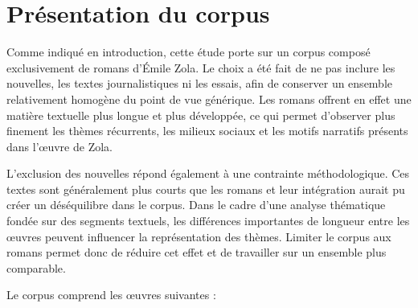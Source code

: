 \section{Présentation du corpus}

Comme indiqué en introduction, cette étude porte sur un corpus composé exclusivement de romans d'Émile Zola. Le choix a été fait de ne pas inclure les nouvelles, les textes journalistiques ni les essais, afin de conserver un ensemble relativement homogène du point de vue générique. Les romans offrent en effet une matière textuelle plus longue et plus développée, ce qui permet d'observer plus finement les thèmes récurrents, les milieux sociaux et les motifs narratifs présents dans l'œuvre de Zola.

L'exclusion des nouvelles répond également à une contrainte méthodologique. Ces textes sont généralement plus courts que les romans et leur intégration aurait pu créer un déséquilibre dans le corpus. Dans le cadre d'une analyse thématique fondée sur des segments textuels, les différences importantes de longueur entre les œuvres peuvent influencer la représentation des thèmes. Limiter le corpus aux romans permet donc de réduire cet effet et de travailler sur un ensemble plus comparable.

Le corpus comprend les œuvres suivantes :

